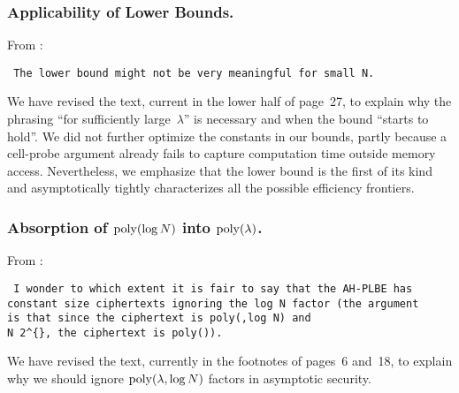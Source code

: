 \subsubsection{Applicability of Lower Bounds.}
From :

\texttt{
The lower bound might not be very meaningful for small N.
}

We have revised the text, current in the lower half of page~27,
to explain why the phrasing ``for sufficiently large~$\lambda$'' is necessary
and when the bound ``starts to hold''.
We did not further optimize the constants in our bounds,
partly because a cell-probe argument
already fails to capture computation time outside memory access.
Nevertheless, we emphasize that the lower bound is the first of its kind
and asymptotically tightly characterizes all the possible efficiency frontiers.

\subsubsection{Absorption of $\operatorname{poly}(\log N)$ into $\operatorname{poly}(\lambda)$.}
From :

\texttt{
I wonder to which extent it is fair to say that the AH-PLBE has \\
constant size ciphertexts ignoring the log N factor (the argument \\
is that since the ciphertext is poly({\string\lambda},log N) and \\
N {\string\leq} 2\string^\{{\string\lambda}\}, the ciphertext is poly({\string\lambda})).
}

We have revised the text,
currently in the footnotes of pages~6 and~18,
to explain why we should ignore $\operatorname{poly}(\lambda,\log N)$ factors
in asymptotic security.

